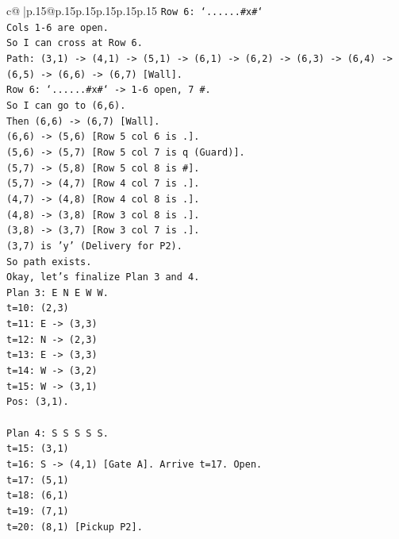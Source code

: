 \documentclass{article}
\begin{document}
{\begin{supertabular}{c@{$\;$}|p{.15\linewidth}@{}p{.15\linewidth}p{.15\linewidth}p{.15\linewidth}p{.15\linewidth}p{.15\linewidth}}
{{{\texttt{Row 6: `......\#x\#`} \\
\texttt{Cols 1{-}6 are open.} \\
\texttt{So I can cross at Row 6.} \\
\texttt{Path: (3,1) {-}> (4,1) {-}> (5,1) {-}> (6,1) {-}> (6,2) {-}> (6,3) {-}> (6,4) {-}> (6,5) {-}> (6,6) {-}> (6,7) {[}Wall{]}.} \\
\texttt{Row 6: `......\#x\#` {-}> 1{-}6 open, 7 \#.} \\
\texttt{So I can go to (6,6).} \\
\texttt{Then (6,6) {-}> (6,7) {[}Wall{]}.} \\
\texttt{(6,6) {-}> (5,6) {[}Row 5 col 6 is .{]}.} \\
\texttt{(5,6) {-}> (5,7) {[}Row 5 col 7 is q (Guard){]}.} \\
\texttt{(5,7) {-}> (5,8) {[}Row 5 col 8 is \#{]}.} \\
\texttt{(5,7) {-}> (4,7) {[}Row 4 col 7 is .{]}.} \\
\texttt{(4,7) {-}> (4,8) {[}Row 4 col 8 is .{]}.} \\
\texttt{(4,8) {-}> (3,8) {[}Row 3 col 8 is .{]}.} \\
\texttt{(3,8) {-}> (3,7) {[}Row 3 col 7 is .{]}.} \\
\texttt{(3,7) is 'y' (Delivery for P2).} \\
\texttt{So path exists.} \\
\texttt{Okay, let's finalize Plan 3 and 4.} \\
\texttt{Plan 3: E N E W W.} \\
\texttt{t=10: (2,3)} \\
\texttt{t=11: E {-}> (3,3)} \\
\texttt{t=12: N {-}> (2,3)} \\
\texttt{t=13: E {-}> (3,3)} \\
\texttt{t=14: W {-}> (3,2)} \\
\texttt{t=15: W {-}> (3,1)} \\
\texttt{Pos: (3,1).} \\
\\ 
\texttt{Plan 4: S S S S S.} \\
\texttt{t=15: (3,1)} \\
\texttt{t=16: S {-}> (4,1) {[}Gate A{]}. Arrive t=17. Open.} \\
\texttt{t=17: (5,1)} \\
\texttt{t=18: (6,1)} \\
\texttt{t=19: (7,1)} \\
\texttt{t=20: (8,1) {[}Pickup P2{]}.} \\
}}}
\end{supertabular}}
\end{document}
